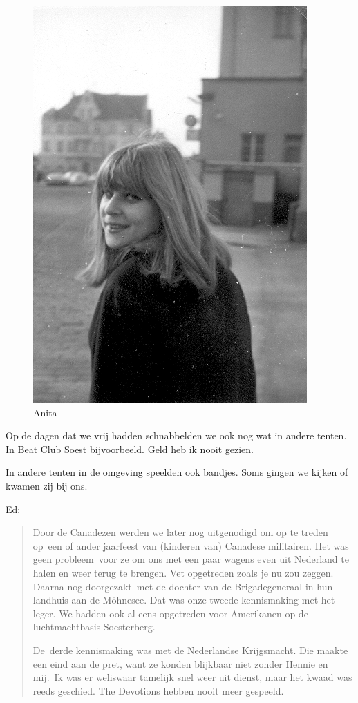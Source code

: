 \documentclass[10pt,twoside, openright]{memoir}
\begin{document}
\begin{figure}
\includegraphics[width=\textwidth]{img/165-Soest1}
\caption*{\footnotesize Anita}
\end{figure}

Op de dagen dat we vrij hadden schnabbelden we ook nog wat in andere tenten. In Beat Club Soest bijvoorbeeld. Geld heb ik nooit gezien. 

In andere tenten in de omgeving speelden ook bandjes. Soms gingen we kijken of kwamen zij bij ons. 	

Ed:

\begin{quote}
Door de Canadezen werden we later nog uitgenodigd om op te treden op een of ander jaarfeest van (kinderen van) Canadese militairen. Het was geen probleem voor ze om ons met een paar wagens even uit Nederland te halen en weer terug te brengen. Vet opgetreden zoals je nu zou zeggen. Daarna nog doorgezakt met de dochter van de Brigadegeneraal in hun landhuis aan de Möhnesee. Dat was onze tweede kennismaking met het leger. We hadden ook al eens opgetreden voor Amerikanen op de luchtmachtbasis Soesterberg. 

De derde kennismaking was met de Nederlandse Krijgsmacht. Die maakte een eind aan de pret, want ze konden blijkbaar niet zonder Hennie en mij. Ik was er weliswaar tamelijk snel weer uit dienst, maar het kwaad was reeds geschied. The Devotions hebben nooit meer gespeeld.
\end{quote}
\end{document}
